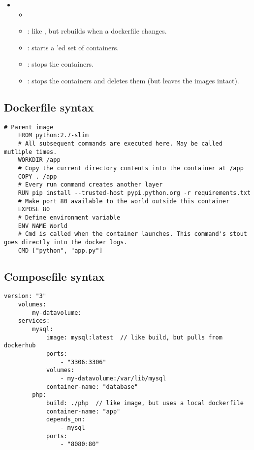 \begin{itemize}
\begin{itemize}
\begin{itemize}
            \end{itemize}
    \end{itemize}
    \item {} \begin{itemize}
            \item {}
            \item {}: like , but rebuilds when a dockerfile changes.
            \item {}: starts a 'ed set of containers.
            \item {}: stops the containers.
            \item {}: stops the containers and deletes them (but leaves the images intact).
        \end{itemize}
\end{itemize}

\subsection{Dockerfile syntax}
\begin{lstlisting}[title=Dockerfile]
    # Parent image
    FROM python:2.7-slim
    # All subsequent commands are executed here. May be called mutliple times.
    WORKDIR /app
    # Copy the current directory contents into the container at /app
    COPY . /app
    # Every run command creates another layer
    RUN pip install --trusted-host pypi.python.org -r requirements.txt
    # Make port 80 available to the world outside this container
    EXPOSE 80
    # Define environment variable
    ENV NAME World
    # Cmd is called when the container launches. This command's stout goes directly into the docker logs.
    CMD ["python", "app.py"]
\end{lstlisting}


\subsection{Composefile syntax}
\begin{lstlisting}[title=docker-compose.yml]
    version: "3"
    volumes:
        my-datavolume:
    services: 
        mysql: 
            image: mysql:latest  // like build, but pulls from dockerhub
            ports: 
                - "3306:3306"
            volumes:
                - my-datavolume:/var/lib/mysql
            container-name: "database"
        php:
            build: ./php  // like image, but uses a local dockerfile
            container-name: "app"
            depends_on:
                - mysql
            ports:
                - "8080:80"
\end{lstlisting}




